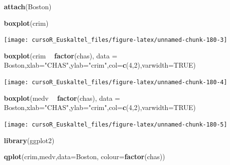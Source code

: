 \documentclass[]{book}
\newenvironment{Shaded}{\begin{snugshade}}{\end{snugshade}}
\newcommand{\KeywordTok}[1]{\textcolor[rgb]{0.13,0.29,0.53}{\textbf{#1}}}
\newcommand{\DataTypeTok}[1]{\textcolor[rgb]{0.13,0.29,0.53}{#1}}
\newcommand{\DecValTok}[1]{\textcolor[rgb]{0.00,0.00,0.81}{#1}}
\newcommand{\StringTok}[1]{\textcolor[rgb]{0.31,0.60,0.02}{#1}}
\newcommand{\OtherTok}[1]{\textcolor[rgb]{0.56,0.35,0.01}{#1}}
\newcommand{\OperatorTok}[1]{\textcolor[rgb]{0.81,0.36,0.00}{\textbf{#1}}}
\newcommand{\NormalTok}[1]{#1}
\begin{document}
\begin{Shaded}
\begin{Highlighting}[]
\KeywordTok{attach}\NormalTok{(Boston)}

\KeywordTok{boxplot}\NormalTok{(crim)}
\end{Highlighting}
\end{Shaded}

\begin{center}\texttt{[image: cursoR\_Euskaltel\_files/figure-latex/unnamed-chunk-180-3]} \end{center}

\begin{Shaded}
\begin{Highlighting}[]
\KeywordTok{boxplot}\NormalTok{(crim }\OperatorTok{~}\StringTok{ }\KeywordTok{factor}\NormalTok{(chas), }\DataTypeTok{data =}\NormalTok{ Boston,}\DataTypeTok{xlab=}\StringTok{"CHAS"}\NormalTok{,}\DataTypeTok{ylab=}\StringTok{"crim"}\NormalTok{,}\DataTypeTok{col=}\KeywordTok{c}\NormalTok{(}\DecValTok{4}\NormalTok{,}\DecValTok{2}\NormalTok{),}\DataTypeTok{varwidth=}\OtherTok{TRUE}\NormalTok{)}
\end{Highlighting}
\end{Shaded}

\begin{center}\texttt{[image: cursoR\_Euskaltel\_files/figure-latex/unnamed-chunk-180-4]} \end{center}

\begin{Shaded}
\begin{Highlighting}[]
\KeywordTok{boxplot}\NormalTok{(medv }\OperatorTok{~}\StringTok{ }\KeywordTok{factor}\NormalTok{(chas), }\DataTypeTok{data =}\NormalTok{ Boston,}\DataTypeTok{xlab=}\StringTok{"CHAS"}\NormalTok{,}\DataTypeTok{ylab=}\StringTok{"crim"}\NormalTok{,}\DataTypeTok{col=}\KeywordTok{c}\NormalTok{(}\DecValTok{4}\NormalTok{,}\DecValTok{2}\NormalTok{),}\DataTypeTok{varwidth=}\OtherTok{TRUE}\NormalTok{)}
\end{Highlighting}
\end{Shaded}

\begin{center}\texttt{[image: cursoR\_Euskaltel\_files/figure-latex/unnamed-chunk-180-5]} \end{center}

\begin{Shaded}
\begin{Highlighting}[]
\KeywordTok{library}\NormalTok{(ggplot2)}

\KeywordTok{qplot}\NormalTok{(crim,medv,}\DataTypeTok{data=}\NormalTok{Boston, }\DataTypeTok{colour=}\KeywordTok{factor}\NormalTok{(chas))}
\end{Highlighting}
\end{Shaded}
\end{document}
